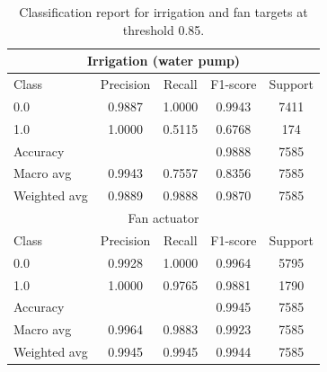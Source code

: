 \documentclass[sn-mathphys,Numbered]{sn-jnl}
\begin{document}
\begin{table}[ht]
    \centering
    \caption{Classification report for irrigation and fan targets at threshold 0.85.}
    \label{tab:thr-0.85}
    \begin{tabular}{lcccc}
        \toprule
        \multicolumn{5}{c}{Irrigation (water pump)} \\
        \midrule
        Class & Precision & Recall & F1-score & Support \\
        \midrule
        0.0 & 0.9887 & 1.0000 & 0.9943 & 7411 \\
        1.0 & 1.0000 & 0.5115 & 0.6768 & 174 \\
        \midrule
        Accuracy     &        &        & 0.9888 & 7585 \\
        Macro avg    & 0.9943 & 0.7557 & 0.8356 & 7585 \\
        Weighted avg & 0.9889 & 0.9888 & 0.9870 & 7585 \\
        \midrule
        \multicolumn{5}{c}{Fan actuator} \\
        \midrule
        Class & Precision & Recall & F1-score & Support \\
        \midrule
        0.0 & 0.9928 & 1.0000 & 0.9964 & 5795 \\
        1.0 & 1.0000 & 0.9765 & 0.9881 & 1790 \\
        \midrule
        Accuracy     &        &        & 0.9945 & 7585 \\
        Macro avg    & 0.9964 & 0.9883 & 0.9923 & 7585 \\
        Weighted avg & 0.9945 & 0.9945 & 0.9944 & 7585 \\
        \bottomrule
    \end{tabular}
\end{table}
\end{document}
